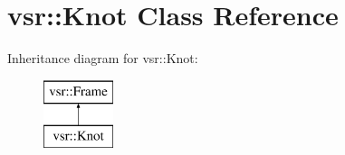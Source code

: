 \hypertarget{classvsr_1_1_knot}{\section{vsr\-:\-:Knot Class Reference}
\label{classvsr_1_1_knot}
}
Inheritance diagram for vsr\-:\-:Knot\-:\begin{figure}[H]
\begin{center}
\leavevmode
\includegraphics[height=2.000000cm]{classvsr_1_1_knot}
\end{center}
\end{figure}
